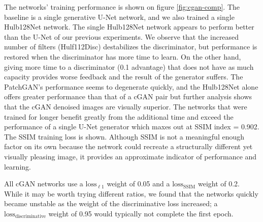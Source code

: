 
The networks' training performance is shown on figure \ref{fig:cgan-comp}. The baseline is a single generative U-Net network, and we also trained a single Hulb128Net network. The single Hulb128Net network appears to perform better than the U-Net of our previous experiments. We observe that the increased number of filters (Hulf112Disc) destabilizes the discriminator, but performance is restored when the discriminator has more time to learn. On the other hand, giving more time to a discriminator (0.1 advantage) that does not have as much capacity provides worse feedback and the result of the generator suffers. The PatchGAN's performance seems to degenerate quickly, and the Hulb128Net alone offers greater performance than that of a \acs{cGAN} pair but further analysis shows that the \acs{cGAN} denoised images are visually superior. The networks that were trained for longer benefit greatly from the additional time and exceed the performance of a single U-Net generator which maxes out at \acs{SSIM} index = 0.902. The \acs{SSIM} training loss is shown. Although \acs{SSIM} is not a meaningful enough factor on its own because the network could recreate a structurally different yet visually pleasing image, it provides an approximate indicator of performance and learning.

All \ac{cGAN} networks use a $\text{loss}_{\ell 1}$ weight of 0.05 and a $\text{loss}_\text{SSIM}$ weight of 0.2. While it may be worth trying different ratios, we found that the networks quickly became unstable as the weight of the discriminative loss increased; a $\text{loss}_\text{discriminative}$ weight of 0.95 would typically not complete the first epoch.


